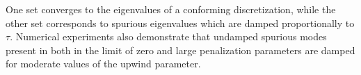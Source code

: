 \documentclass[10pt]{article}
\date{}
\begin{document}
\maketitle

One set converges to the eigenvalues of a conforming discretization, while the other set corresponds to spurious eigenvalues which are damped proportionally to $\tau$.  Numerical experiments also demonstrate that undamped spurious modes present in both in the limit of zero and large penalization parameters are damped for moderate values of the upwind parameter.  
\end{document}
